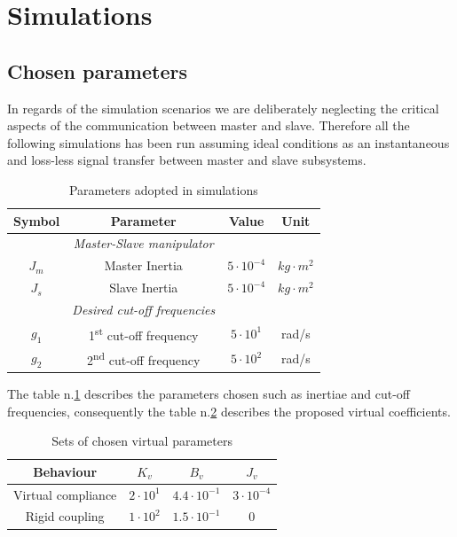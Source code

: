 \bigskip
\section{Simulations}

\subsection{Chosen parameters}

In regards of the simulation scenarios we are deliberately neglecting the
critical aspects of the communication between master and slave.
\newline
Therefore all the following simulations has been run assuming ideal conditions as an
instantaneous and loss-less signal transfer between master and slave subsystems.
\newline
\bigskip
\bigskip
\bigskip


\begin{table}[H]
\centering
	\begin{tabular}{c c c c}
		\toprule
		Symbol & Parameter & Value & Unit\\
		\midrule 
		\midrule 
    & \textsl{Master-Slave manipulator}\\
		\midrule 
		$J_{m}$  & Master Inertia & $5\cdot 10^{-4}$ & $kg\cdot m^{2}$ \\
		$J_{s}$  & Slave Inertia & $5\cdot 10^{-4}$ & $kg\cdot m^{2}$ \\
    \midrule 
    & \textsl{Desired cut-off frequencies}\\
		\midrule 
		$g_{1}$  & 1\textsuperscript{st} cut-off frequency & $5\cdot 10^{1}$ & rad/s \\
		$g_{2}$  & 2\textsuperscript{nd} cut-off frequency & $5\cdot 10^{2}$ & rad/s \\
		\bottomrule
	\end{tabular}
	\caption{Parameters adopted in simulations}
	\label{simParams}
\end{table}

\bigskip
\bigskip
The table n.\ref{simParams} describes the parameters chosen such as inertiae and
cut-off frequencies, consequently the table n.\ref{virtParams} describes
the proposed virtual coefficients.
\bigskip
\bigskip
\bigskip

\begin{table}[H]
\centering
	\begin{tabular}{c c c c}
		\toprule
		Behaviour & $K_{v}$ & $B_{v}$ &  $J_{v}$\\
		\midrule 
		\midrule 
    Virtual compliance& $2\cdot 10^{1}$ & $4.4\cdot 10^{-1}$ & $3\cdot 10^{-4}$\\
    Rigid coupling & $1\cdot 10^{2}$ & $1.5\cdot 10^{-1}$ & 0\\
		\bottomrule
	\end{tabular}
	\caption{Sets of chosen virtual parameters}
	\label{virtParams}
\end{table}
\newpage

